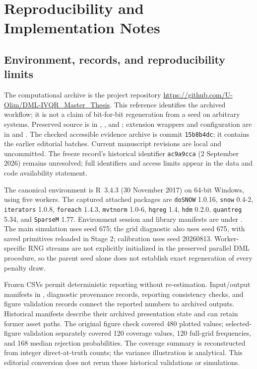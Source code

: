 \clearpage
\section{Reproducibility and Implementation Notes}
\label{app:reproducibility}
\setcounter{equation}{0}\setcounter{table}{0}\setcounter{figure}{0}
\subsection{Environment, records, and reproducibility limits}
The computational archive is the project repository \url{https://github.com/U-Olim/DML-IVQR_Master_Thesis}. This reference identifies the archived workflow; it is not a claim of bit-for-bit regeneration from a seed on arbitrary systems. Preserved source is in , , and ; extension wrappers and configuration are in  and . The checked accessible evidence archive is commit \texttt{15b8b4dc}; it contains the earlier editorial batches. Current manuscript revisions are local and uncommitted. The freeze record's historical identifier \texttt{ac9a9cca} (2 September 2026) remains unresolved; full identifiers and access limits appear in the data and code availability statement.

The canonical environment is R~3.4.3 (30 November 2017) on 64-bit Windows, using five workers. The captured attached packages are \texttt{doSNOW} 1.0.16, \texttt{snow} 0.4-2, \texttt{iterators} 1.0.8, \texttt{foreach} 1.4.3, \texttt{mvtnorm} 1.0-6, \texttt{hqreg} 1.4, \texttt{hdm} 0.2.0, \texttt{quantreg} 5.34, and \texttt{SparseM} 1.77. Environment session and library manifests are under . The main simulation uses seed 675; the grid diagnostic also uses seed 675, with saved primitives reloaded in Stage 2; calibration uses seed 20260813. Worker-specific RNG streams are not explicitly initialized in the preserved parallel DML procedure, so the parent seed alone does not establish exact regeneration of every penalty draw.

Frozen CSVs permit deterministic reporting without re-estimation. Input/output manifests in , diagnostic provenance records, reporting consistency checks, and figure validation records connect the reported numbers to archived outputs. Historical manifests describe their archived presentation state and can retain former asset paths. The original figure check covered 480 plotted values; selected-figure validation separately covered 120 coverage values, 120 full-grid frequencies, and 168 median rejection probabilities. The coverage summary is reconstructed from integer direct-at-truth counts; the variance illustration is analytical. This editorial conversion does not rerun those historical validations or simulations.

